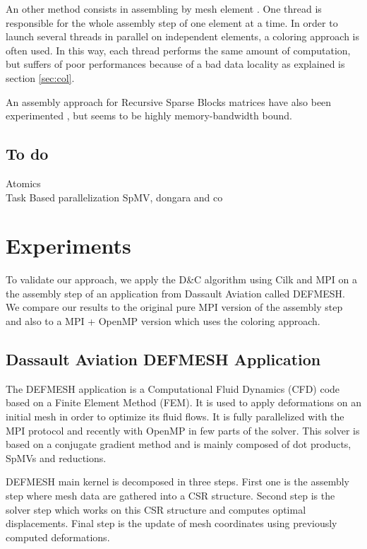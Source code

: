 \documentclass{IOS-Book-Article}
\begin{document}
An other method consists in assembling by mesh element \cite{CUDAfe,CPUfe1,CPUfe2}. One thread is responsible for the whole assembly step of one element at a time.
In order to launch several threads in parallel on independent elements, a coloring approach is often used.
In this way, each thread performs the same amount of computation, but suffers of poor performances because of a bad data locality as explained is section \ref{sec:col}.

An assembly approach for Recursive Sparse Blocks matrices have also been experimented \cite{RSBasm}, but seems to be highly memory-bandwidth bound.

\subsection{To do}
Atomics\\
Task Based parallelization SpMV, dongara and co \cite{MPI_task}\\

\section{Experiments}
To validate our approach, we apply the D\&C algorithm using Cilk and MPI on a the assembly step of an application from Dassault Aviation called DEFMESH.
We compare our results to the original pure MPI version of the assembly step and also to a MPI + OpenMP version which uses the coloring approach.

\subsection{Dassault Aviation DEFMESH Application}
The DEFMESH application is a Computational Fluid Dynamics (CFD) code based on a Finite Element Method (FEM).
It is used to apply deformations on an initial mesh in order to optimize its fluid flows.
It is fully parallelized with the MPI protocol and recently with OpenMP in few parts of the solver.
This solver is based on a conjugate gradient method and is mainly composed of dot products, SpMVs and reductions.

DEFMESH main kernel is decomposed in three steps.
First one is the assembly step where mesh data are gathered into a CSR structure.
Second step is the solver step which works on this CSR structure and computes optimal displacements.
Final step is the update of mesh coordinates using previously computed deformations.
\end{document}
